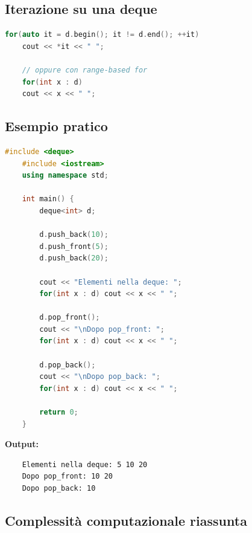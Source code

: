 \subsection{Iterazione su una deque}

\begin{lstlisting}[language=C++]
	for(auto it = d.begin(); it != d.end(); ++it)
	cout << *it << " ";
	
	// oppure con range-based for
	for(int x : d)
	cout << x << " ";
\end{lstlisting}

\subsection{Esempio pratico}

\begin{lstlisting}[language=C++]
	#include <deque>
	#include <iostream>
	using namespace std;
	
	int main() {
		deque<int> d;
		
		d.push_back(10);
		d.push_front(5);
		d.push_back(20);
		
		cout << "Elementi nella deque: ";
		for(int x : d) cout << x << " ";
		
		d.pop_front();
		cout << "\nDopo pop_front: ";
		for(int x : d) cout << x << " ";
		
		d.pop_back();
		cout << "\nDopo pop_back: ";
		for(int x : d) cout << x << " ";
		
		return 0;
	}
\end{lstlisting}

\textbf{Output:}
\begin{verbatim}
	Elementi nella deque: 5 10 20
	Dopo pop_front: 10 20
	Dopo pop_back: 10
\end{verbatim}


\newpage
\subsection{Complessità computazionale riassunta}

